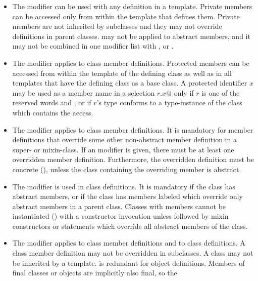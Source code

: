 \documentclass[a4paper,12pt,twoside,titlepage]{book}
\begin{document}
\begin{itemize}
\item
The  modifier can be used with any definition in a
template. Private members can be accessed only from within the template
that defines them.  
Private members are not inherited by subclasses and they
may not override definitions in parent classes.
 may not be applied to abstract members, and it
may not be combined in one modifier list with
,  or .
\item
The  modifier applies to class member definitions.
Protected members can be accessed from within the template of the defining
class as well as in all templates that have the defining class as a base class.
A protected identifier $x$ may be used as
a member name in a selection \lstinline@$r$.$x$@ only if $r$ is one of the reserved
words  and
, or if $r$'s type conforms to a type-instance of the class
which contains the access.
\item
The  modifier applies to class member definitions.  It
is mandatory for member definitions that override some other
non-abstract member definition in a super- or mixin-class. If an
 modifier is given, there must be at least one
overridden member definition.  Furthermore, the overridden definition
must be concrete (), unless the class containing the
overriding member is abstract.
\item
The  modifier is used in class definitions. It is
mandatory if the class has abstract members, or if the class has
members labeled  which override only abstract members
in a parent class.  Classes with  members
cannot be instantiated () with a constructor
invocation unless followed by mixin constructors or statements which
override all abstract members of the class.
\item
The  modifier applies to class member definitions and to
class definitions. A  class member definition may not be
overridden in subclasses. A  class may not be inherited by
a template.  is redundant for object definitions.  Members
of final classes or objects are implicitly also final, so the

\end{itemize}
\end{document}
